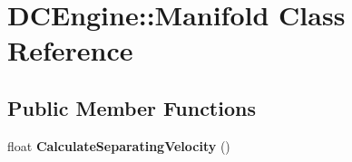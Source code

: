 \hypertarget{classDCEngine_1_1Manifold}{\section{D\-C\-Engine\-:\-:Manifold Class Reference}
\label{classDCEngine_1_1Manifold}
}
\subsection*{Public Member Functions}
\begin{DoxyCompactItemize}
\item 
\hypertarget{classDCEngine_1_1Manifold_a9d43ef33bc3205a278967d974ab0d6d0}{float {\bfseries Calculate\-Separating\-Velocity} ()}\label{classDCEngine_1_1Manifold_a9d43ef33bc3205a278967d974ab0d6d0}

\end{DoxyCompactItemize}
